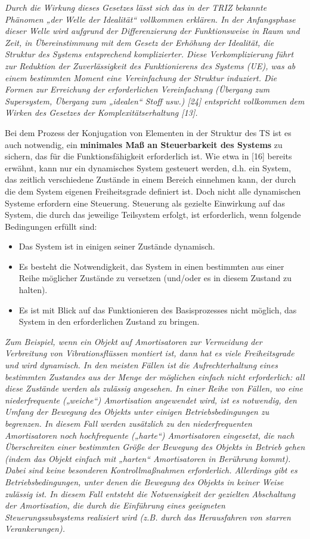 \documentclass[11pt,a4paper]{article}
\begin{document}
\emph{ Durch die Wirkung dieses Gesetzes lässt sich das in der TRIZ bekannte
  Phänomen „der Welle der Idealität“ vollkommen erklären. In der Anfangsphase
  dieser Welle wird aufgrund der Differenzierung der Funktionsweise in Raum
  und Zeit, in Übereinstimmung mit dem Gesetz der Erhöhung der Idealität, die
  Struktur des Systems entsprechend komplizierter. Diese Verkomplizierung
  führt zur Reduktion der Zuverlässigkeit des Funktionierens des Systems (UE),
  was ab einem bestimmten Moment eine Vereinfachung der Struktur induziert.
  Die Formen zur Erreichung der erforderlichen Vereinfachung (Übergang zum
  Supersystem, Übergang zum „idealen“ Stoff usw.) [24] entspricht vollkommen
  dem Wirken des Gesetzes der Komplexitätserhaltung [13].}

Bei dem Prozess der Konjugation von Elementen in der Struktur des TS ist es
auch notwendig, ein \textbf{minimales Maß an Steuerbarkeit des Systems} zu
sichern, das für die Funktionsfähigkeit erforderlich ist. Wie etwa in [16]
bereits erwähnt, kann nur ein dynamisches System gesteuert werden, d.h. ein
System, das zeitlich verschiedene Zustände in einem Bereich einnehmen kann,
der durch die dem System eigenen Freiheitsgrade definiert ist. Doch nicht alle
dynamischen Systeme erfordern eine Steuerung. Steuerung als gezielte
Einwirkung auf das System, die durch das jeweilige Teilsystem erfolgt, ist
erforderlich, wenn folgende Bedingungen erfüllt sind:
\begin{itemize}
\item Das System ist in einigen seiner Zustände dynamisch.
\item Es besteht die Notwendigkeit, das System in einen bestimmten aus einer
  Reihe möglicher Zustände zu versetzen (und/oder es in diesem Zustand zu
  halten).
\item Es ist mit Blick auf das Funktionieren des Basisprozesses nicht möglich,
  das System in den erforderlichen Zustand zu bringen.
\end{itemize}
\emph{ Zum Beispiel, wenn ein Objekt auf Amortisatoren zur Vermeidung der
  Verbreitung von Vibrationsflüssen montiert ist, dann hat es viele
  Freiheitsgrade und wird dynamisch. In den meisten Fällen ist die
  Aufrechterhaltung eines bestimmten Zustandes aus der Menge der möglichen
  einfach nicht erforderlich: all diese Zustände werden als zulässig
  angesehen. In einer Reihe von Fällen, wo eine niederfrequente („weiche“)
  Amortisation angewendet wird, ist es notwendig, den Umfang der Bewegung des
  Objekts unter einigen Betriebsbedingungen zu begrenzen. In diesem Fall
  werden zusätzlich zu den niederfrequenten Amortisatoren noch hochfrequente
  („harte“) Amortisatoren eingesetzt, die nach Überschreiten einer bestimmten
  Größe der Bewegung des Objekts in Betrieb gehen (indem das Objekt einfach
  mit „harten“ Amortisatoren in Berührung kommt). Dabei sind keine besonderen
  Kontrollmaßnahmen erforderlich. Allerdings gibt es Betriebsbedingungen,
  unter denen die Bewegung des Objekts in keiner Weise zulässig ist.  In
  diesem Fall entsteht die Notwensigkeit der gezielten Abschaltung der
  Amortisation, die durch die Einführung eines geeigneten Steuerungssubsystems
  realisiert wird (z.B. durch das Herausfahren von starren Verankerungen).}
\end{document}
